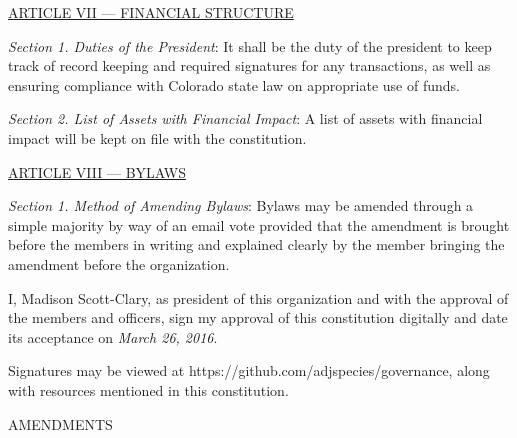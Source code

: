 \documentclass{article}
\begin{document}
\bigskip

\large{\underline{ARTICLE VII --- FINANCIAL STRUCTURE}}

\emph{Section 1. Duties of the President}: It shall be the duty of the president to keep track of record keeping and required signatures for any transactions, as well as ensuring compliance with Colorado state law on appropriate use of funds.

\emph{Section 2. List of Assets with Financial Impact}: A list of assets with financial impact will be kept on file with the constitution.

\bigskip

\large{\underline{ARTICLE VIII --- BYLAWS}}

\emph{Section 1. Method of Amending Bylaws}: Bylaws may be amended through a simple majority by way of an email vote provided that the amendment is brought before the members in writing and explained clearly by the member bringing the amendment before the organization.

\newpage

I, Madison Scott-Clary, as president of this organization and with the approval of the members and officers, sign my approval of this constitution digitally and date its acceptance on \emph{March 26, 2016}.

Signatures may be viewed at https://github.com/adjspecies/governance, along with resources mentioned in this constitution.

\bigskip

\newpage

\begin{center}
\Huge{AMENDMENTS}
\end{center}
\end{document}
